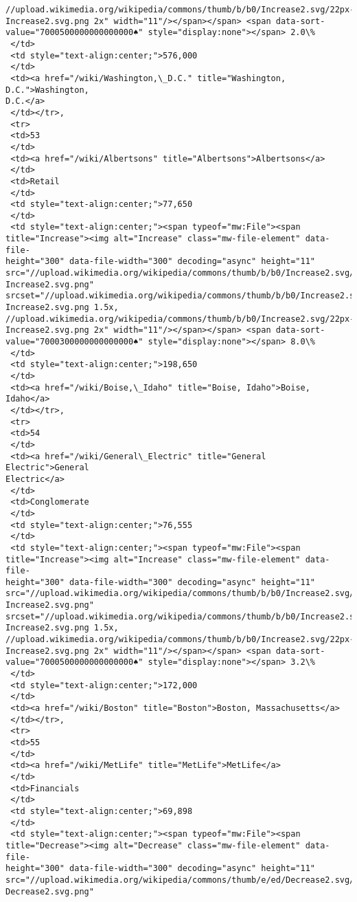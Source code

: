 \documentclass[11pt]{article}
\begin{document}
\begin{tcolorbox}[breakable, size=fbox, boxrule=.5pt, pad at break*=1mm, opacityfill=0]
\begin{Verbatim}[commandchars=\\\{\}]
//upload.wikimedia.org/wikipedia/commons/thumb/b/b0/Increase2.svg/22px-
Increase2.svg.png 2x" width="11"/></span></span> <span data-sort-
value="7000500000000000000♠" style="display:none"></span> 2.0\%
 </td>
 <td style="text-align:center;">576,000
 </td>
 <td><a href="/wiki/Washington,\_D.C." title="Washington, D.C.">Washington,
D.C.</a>
 </td></tr>,
 <tr>
 <td>53
 </td>
 <td><a href="/wiki/Albertsons" title="Albertsons">Albertsons</a>
 </td>
 <td>Retail
 </td>
 <td style="text-align:center;">77,650
 </td>
 <td style="text-align:center;"><span typeof="mw:File"><span
title="Increase"><img alt="Increase" class="mw-file-element" data-file-
height="300" data-file-width="300" decoding="async" height="11"
src="//upload.wikimedia.org/wikipedia/commons/thumb/b/b0/Increase2.svg/11px-
Increase2.svg.png"
srcset="//upload.wikimedia.org/wikipedia/commons/thumb/b/b0/Increase2.svg/17px-
Increase2.svg.png 1.5x,
//upload.wikimedia.org/wikipedia/commons/thumb/b/b0/Increase2.svg/22px-
Increase2.svg.png 2x" width="11"/></span></span> <span data-sort-
value="7000300000000000000♠" style="display:none"></span> 8.0\%
 </td>
 <td style="text-align:center;">198,650
 </td>
 <td><a href="/wiki/Boise,\_Idaho" title="Boise, Idaho">Boise, Idaho</a>
 </td></tr>,
 <tr>
 <td>54
 </td>
 <td><a href="/wiki/General\_Electric" title="General Electric">General
Electric</a>
 </td>
 <td>Conglomerate
 </td>
 <td style="text-align:center;">76,555
 </td>
 <td style="text-align:center;"><span typeof="mw:File"><span
title="Increase"><img alt="Increase" class="mw-file-element" data-file-
height="300" data-file-width="300" decoding="async" height="11"
src="//upload.wikimedia.org/wikipedia/commons/thumb/b/b0/Increase2.svg/11px-
Increase2.svg.png"
srcset="//upload.wikimedia.org/wikipedia/commons/thumb/b/b0/Increase2.svg/17px-
Increase2.svg.png 1.5x,
//upload.wikimedia.org/wikipedia/commons/thumb/b/b0/Increase2.svg/22px-
Increase2.svg.png 2x" width="11"/></span></span> <span data-sort-
value="7000500000000000000♠" style="display:none"></span> 3.2\%
 </td>
 <td style="text-align:center;">172,000
 </td>
 <td><a href="/wiki/Boston" title="Boston">Boston, Massachusetts</a>
 </td></tr>,
 <tr>
 <td>55
 </td>
 <td><a href="/wiki/MetLife" title="MetLife">MetLife</a>
 </td>
 <td>Financials
 </td>
 <td style="text-align:center;">69,898
 </td>
 <td style="text-align:center;"><span typeof="mw:File"><span
title="Decrease"><img alt="Decrease" class="mw-file-element" data-file-
height="300" data-file-width="300" decoding="async" height="11"
src="//upload.wikimedia.org/wikipedia/commons/thumb/e/ed/Decrease2.svg/11px-
Decrease2.svg.png"

\end{Verbatim}
\end{tcolorbox}
\end{document}
